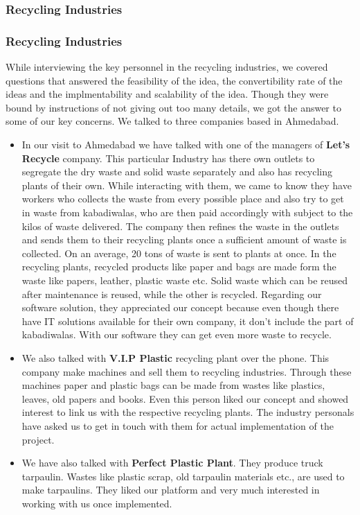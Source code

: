 \documentclass{article}
\begin{document}
\subsubsection{Recycling Industries}
\subsubsection{Recycling Industries}
While interviewing the key personnel in the recycling industries, we covered questions that answered the feasibility of the idea, the convertibility rate of the ideas and the implmentability and scalability of the idea. Though they were bound by instructions of not giving out too many details, we got the answer to some of our key concerns. We talked to three companies based in Ahmedabad.

\begin{itemize}
    \item In our visit to Ahmedabad we have talked with one of the managers of \textbf{Let's Recycle} company. This particular Industry has there own outlets to segregate the dry waste and solid waste separately and also has recycling plants of their own. While interacting with them, we came to know they have workers who collects the waste from every possible place and also try to get in waste from kabadiwalas, who are then paid accordingly with subject to the kilos of waste delivered. The company then refines the waste in the outlets and sends them to their recycling plants once a sufficient amount of waste is collected. On an average, 20 tons of waste is sent to plants at once. In the recycling plants, recycled products like paper and bags are made form the waste like papers, leather, plastic waste etc. Solid waste which can be reused after maintenance is reused, while the other is recycled. 
Regarding our software solution, they appreciated our concept because even though there have IT solutions available for their own company, it don't include the part of kabadiwalas. With our software they can get even more waste to recycle. 

\item We also talked with \textbf{V.I.P Plastic} recycling plant over the phone. This company make machines and sell them to recycling industries. Through these machines paper and plastic bags can be made from wastes like plastics, leaves, old papers and books. Even this person liked our concept and showed interest to link us with the respective recycling plants. The industry personals have asked us to get in touch with them for actual implementation of the project.

\item We have also talked with \textbf{Perfect Plastic Plant}. They produce truck tarpaulin. Wastes like plastic scrap, old tarpaulin materials etc., are used to make tarpaulins. They liked our platform and very much interested in working with us once
implemented.

\end{itemize}
\end{document}
